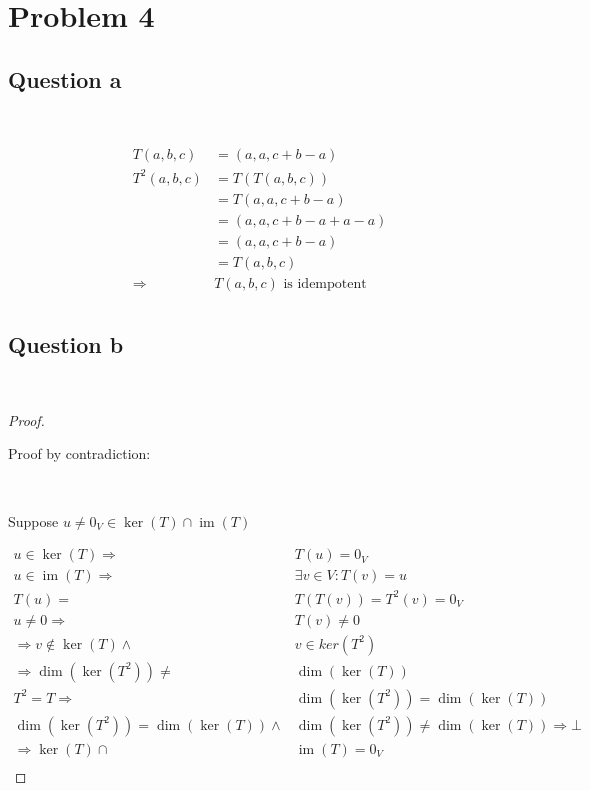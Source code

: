 \documentclass{article}
\DeclareMathOperator{\im}{im}
\begin{document}
\section{Problem 4}

\subsection{Question a}

~

\begin{equation*}
\begin{split}
T(a,b,c)&=(a,a,c+b-a)\\
T^2(a,b,c)&=T(T(a,b,c))\\
&=T(a,a,c+b-a)\\
&=(a,a,c+b-a+a-a)\\
&=(a,a,c+b-a)\\
&=T(a,b,c)\\
\Rightarrow &T(a,b,c) \text{ is idempotent}\\
\end{split}
\end{equation*}

\subsection{Question b}

~

\begin{proof}

~

Proof by contradiction:

~

Suppose $u\ne 0_V \in \ker(T)\cap\im(T)$

\begin{equation*}
\begin{split}
u\in\ker(T)\Rightarrow & T(u)=0_V\\
u\in\im(T)\Rightarrow & \exists v\in V : T(v)=u\\
T(u)=&T(T(v))=T^2(v)=0_V\\
u\ne0\Rightarrow & T(v)\ne 0\\
\Rightarrow v\notin \ker(T)\land & v\in ker(T^2)\\
\Rightarrow \dim(\ker(T^2))\ne&\dim(\ker(T))\\
T^2=T\Rightarrow & \dim(\ker(T^2))=\dim(\ker(T))\\
\dim(\ker(T^2))=\dim(\ker(T))\land &\dim(\ker(T^2))\ne\dim(\ker(T)) \Rightarrow \bot\\
\Rightarrow \ker(T)\cap&\im(T)=0_V\\
\end{split}
\end{equation*}
\end{proof}
\end{document}
